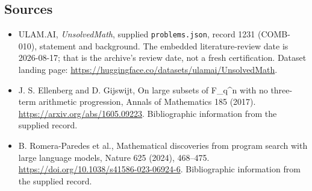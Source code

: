 \documentclass[11pt,a4paper]{article}
\begin{document}
\subsection{Sources}

{\small

\begin{itemize}

\item[\hypertarget{source:1231:1}{S1}] ULAM.AI, \emph{UnsolvedMath}, supplied \texttt{problems.json}, record 1231 (COMB-010), statement and background. The embedded literature-review date is 2026-08-17; that is the archive’s review date, not a fresh certification. Dataset landing page: \url{https://huggingface.co/datasets/ulamai/UnsolvedMath}.

\item[\hypertarget{source:1231:2}{S2}] J. S. Ellenberg and D. Gijswijt, On large subsets of F\_q\textasciicircum{}n with no three-term arithmetic progression, Annals of Mathematics 185 (2017). \url{https://arxiv.org/abs/1605.09223}. Bibliographic information from the supplied record.

\item[\hypertarget{source:1231:3}{S3}] B. Romera-Paredes et al., Mathematical discoveries from program search with large language models, Nature 625 (2024), 468–475. \url{https://doi.org/10.1038/s41586-023-06924-6}. Bibliographic information from the supplied record.

\end{itemize}

}

\label{end:1231}
\end{document}
